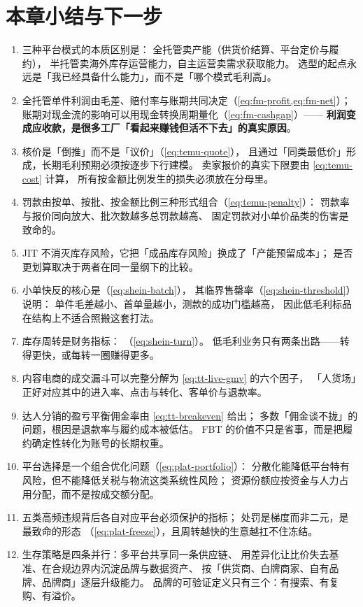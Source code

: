\section{本章小结与下一步}

\begin{keypoint}[本章要点回顾]
\begin{enumerate}
  \item 三种平台模式的本质区别是：
        全托管卖产能（供货价结算、平台定价与履约），
        半托管卖海外库存运营能力，自主运营卖需求获取能力。
        选型的起点永远是「我已经具备什么能力」，而不是「哪个模式毛利高」。
  \item 全托管单件利润由毛差、赔付率与账期共同决定（\cref{eq:fm-profit,eq:fm-net}）；
        账期对现金流的影响可以用现金转换周期量化（\cref{eq:fm-cashgap}）——
        \textbf{利润变成应收款，是很多工厂「看起来赚钱但活不下去」的真实原因}。
  \item 核价是「倒推」而不是「议价」（\cref{eq:temu-quote}），
        且通过「同类最低价」形成，长期毛利预期必须按逐步下行建模。
        卖家报价的真实下限要由 \cref{eq:temu-cost} 计算，
        所有按金额比例发生的损失必须放在分母里。
  \item 罚款由按单、按批、按金额比例三种形式组合（\cref{eq:temu-penalty}）：
        罚款率与报价同向放大、批次数越多总罚款越高、
        固定罚款对小单价品类的伤害是致命的。
  \item JIT 不消灭库存风险，它把「成品库存风险」换成了「产能预留成本」；
        是否更划算取决于两者在同一量纲下的比较。
  \item 小单快反的核心是（\cref{eq:shein-batch}），
        其临界售罄率（\cref{eq:shein-threshold}）说明：
        单件毛差越小、首单量越小，测款的成功门槛越高，
        因此低毛利标品在结构上不适合照搬这套打法。
  \item 库存周转是财务指标：
        （\cref{eq:shein-turn}）。
        低毛利业务只有两条出路——转得更快，或每转一圈赚得更多。
  \item 内容电商的成交漏斗可以完整分解为
        \cref{eq:tt-live-gmv} 的六个因子，
        「人货场」正好对应其中的进入率、点击与转化、客单价与退款率。
  \item 达人分销的盈亏平衡佣金率由 \cref{eq:tt-breakeven} 给出；
        多数「佣金谈不拢」的问题，根因是退款率与履约成本被低估。
        FBT 的价值不只是省事，而是把履约确定性转化为账号的长期权重。
  \item 平台选择是一个组合优化问题（\cref{eq:plat-portfolio}）：
        分散化能降低平台特有风险，但不能降低关税与物流这类系统性风险；
        资源份额应按资金与人力占用分配，而不是按成交额分配。
  \item 五类高频违规背后各自对应平台必须保护的指标；
        处罚是梯度而非二元，是最致命的形态
        （\cref{eq:plat-freeze}），且周转越快的生意越扛不住冻结。
  \item 生存策略是四条并行：多平台共享同一条供应链、
        用差异化让比价失去基准、在合规边界内沉淀品牌与数据资产、
        按「供货商、白牌商家、自有品牌、品牌商」逐层升级能力。
        品牌的可验证定义只有三个：有搜索、有复购、有溢价。
\end{enumerate}
\end{keypoint}
